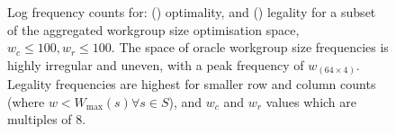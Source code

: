 \documentclass[nonatbib,preprint,10pt]{sigplanconf}
\begin{document}
\begin{figure}
\begin{subfigure}[t]{0.98\columnwidth}
\vspace{-1.5em} %
\caption{}
\label{fig:coverage}
\end{subfigure}
\caption[Workgroup size legality and optimality]{%
  Log frequency counts for: () optimality,
  and () legality for a subset of the aggregated
  workgroup size optimisation space, $w_c \le 100, w_r \le 100$. The
  space of oracle workgroup size frequencies is highly irregular and
  uneven, with a peak frequency of $w_{(64 \times 4)}$. Legality
  frequencies are highest for smaller row and column counts (where
  $w < W_{\max}(s) \forall s \in S$), and $w_c$ and $w_r$ values which
  are multiples of 8.%
}
\label{fig:heatmaps}
\end{figure}



\end{document}
